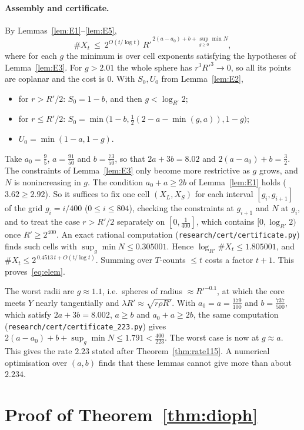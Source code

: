 \documentclass[aps,prx,twocolumn,superscriptaddress,nofootinbib,longbibliography]{revtex4-2}
\theoremstyle{plain}
\theoremstyle{definition}
\theoremstyle{remark}
\begin{document}
\paragraph{Assembly and certificate.} By Lemmas~\ref{lem:E1}--\ref{lem:E5},
\[
\#X_t\ \le\ 2^{O(t/\log t)}\,R'^{\,2(a-a_0)+b+\sup_{g\ge0}\min N},
\]
where for each $g$ the minimum is over cell exponents satisfying the hypotheses of Lemma~\ref{lem:E3}. For $g>2.01$ the whole sphere has $r^3R'^3\to0$, so all its points are coplanar and the cost is $0$. With $S_0,U_0$ from Lemma~\ref{lem:E2},
\begin{itemize}\setlength\itemsep{0pt}
\item for $r>R'/2$: $S_0=1-b$, and then $g<\log_{R'}2$;
\item for $r\le R'/2$: $S_0=\min\big(1-b,\tfrac12(2-a-\min(g,a)),1-g\big)$;
\item $U_0=\min(1-a,1-g)$.
\end{itemize}
Take $a_0=\tfrac95$, $a=\tfrac{91}{50}$ and $b=\tfrac{73}{50}$, so that $2a+3b=8.02$ and $2(a-a_0)+b=\tfrac32$. The constraints of Lemma~\ref{lem:E3} only become more restrictive as $g$ grows, and $N$ is nonincreasing in $g$. The condition $a_0+a\ge2b$ of Lemma~\ref{lem:E1} holds ($3.62\ge2.92$). So it suffices to fix one cell $(X_L,X_S)$ for each interval $[g_i,g_{i+1}]$ of the grid $g_i=i/400$ ($0\le i\le804$), checking the constraints at $g_{i+1}$ and $N$ at $g_i$, and to treat the case $r>R'/2$ separately on $[0,\tfrac1{400}]$, which contains $[0,\log_{R'}2)$ once $R'\ge2^{400}$. An exact rational computation (\texttt{research/cert/certificate.py}) finds such cells with $\sup_g\min N\le0.305001$. Hence $\log_{R'}\#X_t\le1.805001$, and $\#X_t\le2^{\,0.4513\,t+O(t/\log t)}$. Summing over $T$-counts $\le t$ costs a factor $t+1$. This proves~\eqref{eq:elem}.

The worst radii are $g\approx1.1$, i.e.\ spheres of radius $\approx R'^{-0.1}$, at which the core meets $Y$ nearly tangentially and $\lambda R'\approx\sqrt{r\rho R'}$. With $a_0=a=\tfrac{179}{100}$ and $b=\tfrac{737}{500}$, which satisfy $2a+3b=8.002$, $a\ge b$ and $a_0+a\ge2b$, the same computation (\texttt{research/cert/certificate\_223.py}) gives $2(a-a_0)+b+\sup_g\min N\le1.791<\tfrac{400}{223}$. The worst case is now at $g\approx a$. This gives the rate $2.23$ stated after Theorem~\ref{thm:rate115}. A numerical optimisation over $(a,b)$ finds that these lemmas cannot give more than about $2.234$.

\section{Proof of Theorem~\ref{thm:dioph}}\label{app:dioph}
\end{document}
